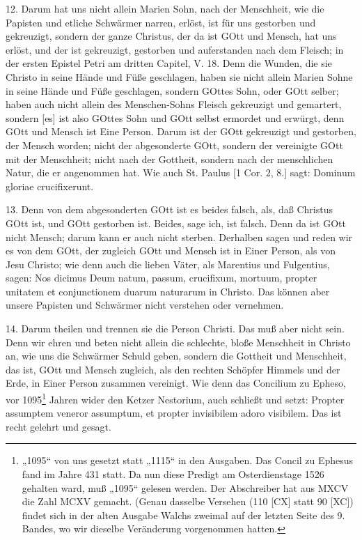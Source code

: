 12. Darum hat uns nicht allein Marien Sohn, nach der Menschheit, wie die Papisten und etliche Schwärmer narren, erlöst, ist für uns gestorben und gekreuzigt, sondern der ganze Christus, der da ist GOtt und Mensch, hat uns erlöst, und der ist gekreuzigt, gestorben und auferstanden nach dem Fleisch; in der ersten Epistel Petri am dritten Capitel, V. 18. Denn die Wunden, die sie Christo in seine Hände und Füße geschlagen, haben sie nicht allein Marien Sohne in seine Hände und Füße geschlagen, sondern GOttes Sohn, oder GOtt selber; haben auch nicht allein des Menschen-Sohns Fleisch gekreuzigt und gemartert, sondern [es] ist also GOttes Sohn und GOtt selbst ermordet und erwürgt, denn GOtt und Mensch ist Eine Person. Darum ist der GOtt gekreuzigt und gestorben, der Mensch worden; nicht der abgesonderte GOtt, sondern der vereinigte GOtt mit der Menschheit; nicht nach der Gottheit, sondern nach der menschlichen Natur, die er angenommen hat. Wie auch St. Paulus [1 Cor. 2, 8.] sagt: Dominum gloriae crucifixerunt.

13. Denn von dem abgesonderten GOtt ist es beides falsch, als, daß Christus GOtt ist, und GOtt gestorben ist. Beides, sage ich, ist falsch. Denn da ist GOtt nicht Mensch; darum kann er auch nicht sterben. Derhalben sagen und reden wir es von dem GOtt, der zugleich GOtt und Mensch ist in Einer Person, als von Jesu Christo; wie denn auch die lieben Väter, als Marentius und Fulgentius, sagen: Nos dicimus Deum natum, passum, crucifixum, mortuum, propter unitatem et conjunctionem duarum naturarum in Christo. Das können aber unsere Papisten und Schwärmer nicht verstehen oder vernehmen.

14. Darum theilen und trennen sie die Person Christi. Das muß aber nicht sein. Denn wir ehren und beten nicht allein die schlechte, bloße Menschheit in Christo an, wie uns die Schwärmer Schuld geben, sondern die Gottheit und Menschheit, das ist, GOtt und Mensch zugleich, als den rechten Schöpfer Himmels und der Erde, in Einer Person zusammen vereinigt. Wie denn das Concilium zu Epheso, vor 1095\footnote{„1095“ von uns gesetzt statt „1115“ in den Ausgaben. Das Concil zu Ephesus fand im Jahre 431 statt. Da nun diese Predigt am Osterdienstage 1526 gehalten ward, muß „1095“ gelesen werden. Der Abschreiber hat aus MXCV die Zahl MCXV gemacht. (Genau dasselbe Versehen (110 [CX] statt 90 [XC]) findet sich in der alten Ausgabe Walchs zweimal auf der letzten Seite des 9. Bandes, wo wir dieselbe Veränderung vorgenommen hatten.} Jahren wider den Ketzer Nestorium, auch schließt und setzt: Propter assumptem veneror assumptum, et propter invisibilem adoro visibilem. Das ist recht gelehrt und gesagt.


